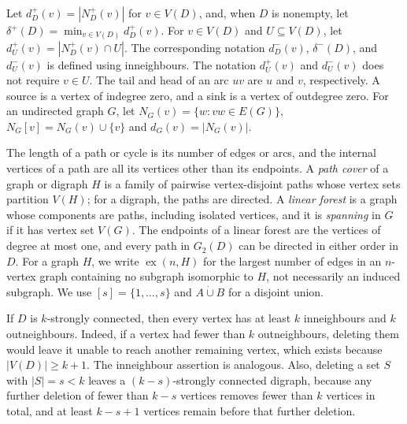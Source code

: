 \documentclass[11pt,a4paper]{article}
\theoremstyle{remark}
\numberwithin{equation}{section}
\DeclareMathOperator{\ex}{ex}
\begin{document}
	Let
	$
	d_D^+(v)=|N_D^+(v)|
	$
	for $v\in V(D)$, and, when $D$ is nonempty, let
	$
	\delta^+(D)=\min_{v\in V(D)} d_D^+(v).
	$
	For $v\in V(D)$ and $U\subseteq V(D)$, let
	$
	d_U^+(v)=|N_D^+(v)\cap U|.
	$
	The corresponding notation $d_D^-(v)$, $\delta^-(D)$, and
	$d_U^-(v)$ is defined using inneighbours. The notation $d_U^+(v)$ and
	$d_U^-(v)$ does not require $v\in U$.
	The tail and head of an arc $uv$ are $u$ and $v$, respectively.
	A source is a vertex of indegree zero, and a sink is a vertex of outdegree zero.
	For an undirected graph $G$, let
	$N_G(v)=\{w:vw\in E(G)\},$
	$N_G[v]=N_G(v)\cup\{v\}$ and
	$d_G(v)=|N_G(v)|.$
	
	The length of a path or cycle is its number of edges or arcs, and the internal vertices of a path
	are all its vertices other than its endpoints.
	A \emph{path cover} of a graph or digraph $H$ is a family of pairwise vertex-disjoint paths
	whose vertex sets partition $V(H)$; for a digraph, the paths are directed.
	A \emph{linear forest} is a graph whose components are paths, including isolated
	vertices, and it is \emph{spanning} in $G$ if it has vertex set $V(G)$.
	The endpoints of a linear forest are the vertices of degree at most one, and every path in $G_2(D)$ can
	be directed in either order in $D$.
	For a graph $H$, we write $\ex(n,H)$ for the largest number of
	edges in an $n$-vertex graph containing no subgraph isomorphic to $H$, not necessarily an induced
	subgraph.
	We use $[s]=\{1,\ldots,s\}$ and $A\mathbin{\dot\cup}B$ for a disjoint union.
	
	If $D$ is $k$-strongly connected, then every vertex has at least $k$ inneighbours and $k$ outneighbours.
	Indeed, if a vertex had fewer than $k$ outneighbours, deleting them would leave it unable to reach another remaining vertex, which exists because $|V(D)|\ge k+1$. The inneighbour assertion is analogous.
	Also, deleting a set $S$ with $|S|=s<k$ leaves a $(k-s)$-strongly connected digraph, because any
	further deletion of fewer than $k-s$ vertices removes fewer than $k$ vertices in total, and at least
	$k-s+1$ vertices remain before that further deletion.
	
\end{document}
